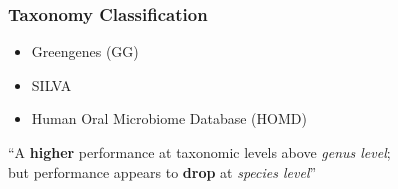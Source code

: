 \documentclass{beamer}
\begin{document}
    \begin{frame}
        \frametitle{Taxonomy Classification}

        \begin{itemize}
            \item Greengenes (GG) \cite{greengenes1}
            \item SILVA \cite{silva1, silva2}
            \item Human Oral Microbiome Database (HOMD) \cite{homd1}
        \end{itemize}

        “A \textbf{higher} performance at taxonomic levels above \textit{genus level}; \\
        but performance appears to \textbf{drop} at \textit{species level}” \cite{performance1}
    \end{frame}
\end{document}
